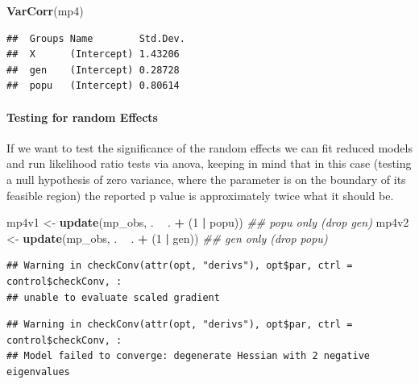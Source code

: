 \documentclass[
  12pt,
]{book}
\newenvironment{Shaded}{\begin{snugshade}}{\end{snugshade}}
\newcommand{\CommentTok}[1]{\textcolor[rgb]{0.56,0.35,0.01}{\textit{#1}}}
\newcommand{\DecValTok}[1]{\textcolor[rgb]{0.00,0.00,0.81}{#1}}
\newcommand{\KeywordTok}[1]{\textcolor[rgb]{0.13,0.29,0.53}{\textbf{#1}}}
\newcommand{\NormalTok}[1]{#1}
\newcommand{\OperatorTok}[1]{\textcolor[rgb]{0.81,0.36,0.00}{\textbf{#1}}}
\newcommand{\StringTok}[1]{\textcolor[rgb]{0.31,0.60,0.02}{#1}}
\begin{document}
\begin{Shaded}
\begin{Highlighting}[]
\KeywordTok{VarCorr}\NormalTok{(mp4)}
\end{Highlighting}
\end{Shaded}

\begin{verbatim}
##  Groups Name        Std.Dev.
##  X      (Intercept) 1.43206 
##  gen    (Intercept) 0.28728 
##  popu   (Intercept) 0.80614
\end{verbatim}

\hypertarget{testing-for-random-effects-1}{%
\paragraph{Testing for random Effects}\label{testing-for-random-effects-1}}

If we want to test the significance of the random effects we can fit reduced models and run likelihood ratio tests via anova, keeping in mind that in this case (testing a null hypothesis of zero variance, where the parameter is on the boundary of its feasible region) the reported p value is approximately twice what it should be.

\begin{Shaded}
\begin{Highlighting}[]
\NormalTok{mp4v1 <-}\StringTok{ }\KeywordTok{update}\NormalTok{(mp_obs, . }\OperatorTok{~}\StringTok{ }\NormalTok{. }\OperatorTok{+}\StringTok{ }\NormalTok{(}\DecValTok{1} \OperatorTok{|}\StringTok{ }\NormalTok{popu)) }\CommentTok{## popu only (drop gen)}
\NormalTok{mp4v2 <-}\StringTok{ }\KeywordTok{update}\NormalTok{(mp_obs, . }\OperatorTok{~}\StringTok{ }\NormalTok{. }\OperatorTok{+}\StringTok{ }\NormalTok{(}\DecValTok{1} \OperatorTok{|}\StringTok{ }\NormalTok{gen)) }\CommentTok{## gen only (drop popu)}
\end{Highlighting}
\end{Shaded}

\begin{verbatim}
## Warning in checkConv(attr(opt, "derivs"), opt$par, ctrl = control$checkConv, :
## unable to evaluate scaled gradient
\end{verbatim}

\begin{verbatim}
## Warning in checkConv(attr(opt, "derivs"), opt$par, ctrl = control$checkConv, :
## Model failed to converge: degenerate Hessian with 2 negative eigenvalues
\end{verbatim}
\end{document}
